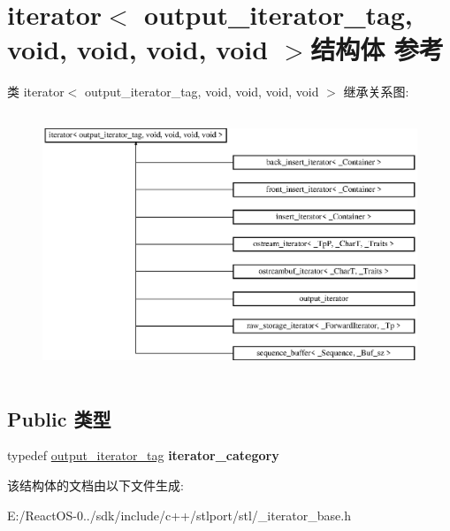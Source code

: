 \hypertarget{structiterator_3_01output__iterator__tag_00_01void_00_01void_00_01void_00_01void_01_4}{}\section{iterator$<$ output\+\_\+iterator\+\_\+tag, void, void, void, void $>$结构体 参考}
\label{structiterator_3_01output__iterator__tag_00_01void_00_01void_00_01void_00_01void_01_4}
类 iterator$<$ output\+\_\+iterator\+\_\+tag, void, void, void, void $>$ 继承关系图\+:\begin{figure}[H]
\begin{center}
\leavevmode
\includegraphics[height=7.850468cm]{structiterator_3_01output__iterator__tag_00_01void_00_01void_00_01void_00_01void_01_4}
\end{center}
\end{figure}
\subsection*{Public 类型}
\begin{DoxyCompactItemize}
\item 
\mbox{\label{structiterator_3_01output__iterator__tag_00_01void_00_01void_00_01void_00_01void_01_4_aa294595469ef70cee33fe99412a06a28}} 
typedef \hyperlink{structoutput__iterator__tag}{output\+\_\+iterator\+\_\+tag} {\bfseries iterator\+\_\+category}
\end{DoxyCompactItemize}


该结构体的文档由以下文件生成\+:\begin{DoxyCompactItemize}
\item 
E\+:/\+React\+O\+S-\/0../sdk/include/c++/stlport/stl/\+\_\+iterator\+\_\+base.\+h\end{DoxyCompactItemize}
